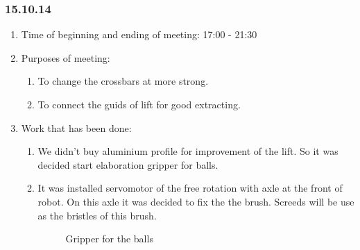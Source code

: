 
\subsubsection{15.10.14}

\begin{enumerate}
	\item Time of beginning and ending of meeting:
	17:00 - 21:30
	\item Purposes of meeting:
	\begin{enumerate}
	  \item To change the crossbars at more strong.
	  
	  \item To connect the guids of lift for good extracting.
	  
    \end{enumerate}
    
	\item Work that has been done:
	\begin{enumerate}
	  \item We didn't buy aluminium profile for improvement of the lift. So it was decided start elaboration gripper for balls.
      
      \item It was installed servomotor of the free rotation with axle at the front of robot. On this axle it was decided to fix the the brush. Screeds will be use as the bristles of this brush.
      
     \begin{figure}[H]
     	\begin{minipage}[h]{1\linewidth}
     		\caption{Gripper for the balls}
     	\end{minipage}
     \end{figure}
      

\end{enumerate}
\end{enumerate}
